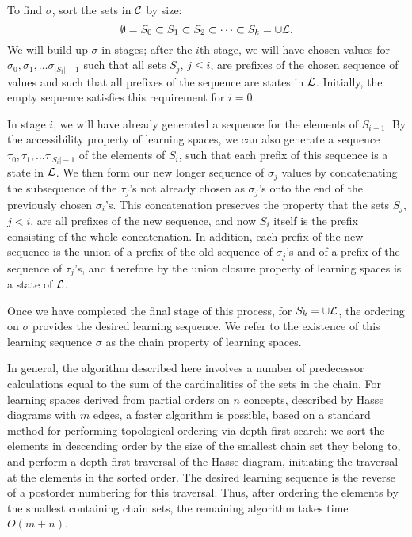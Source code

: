 \documentclass[11pt]{llncs}
\begin{document}
{To find $\sigma$, sort the sets in $\cal C$ by size:
$$\emptyset=S_0\subset S_1\subset S_2\subset\cdots\subset S_k=\cup\cal L.$$
We will build up $\sigma$ in stages; after the $i$th stage,
we will have chosen values for $\sigma_0,\sigma_1,\ldots\sigma_{|S_i|-1}$ such
that all sets $S_j$, $j\le i$, are prefixes of the chosen sequence of values
and such that all prefixes of the sequence are states in $\cal L$.
Initially, the empty sequence satisfies this requirement for $i=0$.

In stage $i$, we will have already generated a sequence for the elements of $S_{i-1}$.
By the accessibility property of learning spaces, we can also generate a sequence
$\tau_0,\tau_1,\ldots\tau_{|S_i|-1}$ of the elements of $S_i$, such that each prefix of this sequence is a state in $\cal L$. We then form our new longer sequence of $\sigma_j$ values by concatenating 
the subsequence of the $\tau_j$'s not already chosen as $\sigma_j$'s onto the end of the previously chosen $\sigma_i$'s. This concatenation preserves the property that the sets $S_j$, $j<i$,
are all prefixes of the new sequence, and now $S_i$ itself is the prefix consisting of the whole concatenation. In addition, each prefix of the new sequence is the union of a prefix of the old sequence of $\sigma_j$'s and of a prefix of the sequence of $\tau_j$'s, and therefore by the union closure property of learning spaces is a state of $\cal L$.

Once we have completed the final stage of this process, for $S_k=\cup\cal L$,
the ordering on $\sigma$ provides the desired learning sequence.
We refer to the existence of this learning sequence $\sigma$ as the chain property of learning spaces.

In general, the algorithm described here involves a number of predecessor calculations equal to the sum of the cardinalities of the sets in the chain. 
For learning spaces derived from partial orders on $n$ concepts, described by Hasse diagrams with $m$ edges, a faster algorithm is possible, based on a standard method for performing topological ordering via depth first search: we sort the elements in descending order by the size of the smallest chain set they belong to, and  perform a depth first traversal of the Hasse diagram, initiating the traversal at the elements in the sorted order. The desired learning sequence is the reverse of a postorder numbering for this traversal. Thus, after ordering the elements by the smallest containing chain sets, the remaining algorithm takes time $O(m+n)$.

}
\end{document}
